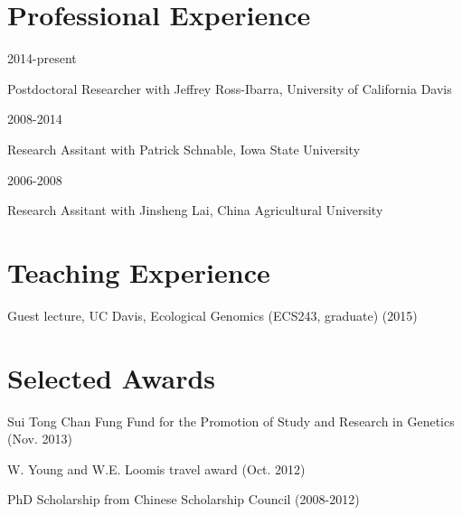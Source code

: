 \documentclass[letterpaper]{article}
\renewenvironment{itemize}{
  \begin{list}{}{
    \setlength{\leftmargin}{1.5em}
  }
}{
  \end{list}
}
\begin{document}
\section*{Professional Experience}
\begin{minipage}{0.2\linewidth}
  2014-present \\
\end{minipage}
\begin{minipage}{0.7\linewidth}
  Postdoctoral Researcher with Jeffrey Ross-Ibarra, University of California Davis \\
\end{minipage}

\begin{minipage}{0.2\linewidth}
  2008-2014 \\
\end{minipage}
\begin{minipage}{0.7\linewidth}
  Research Assitant with Patrick Schnable, Iowa State University \\
\end{minipage}

\begin{minipage}{0.2\linewidth}
  2006-2008 \\
\end{minipage}
\begin{minipage}{0.7\linewidth}
  Research Assitant with Jinsheng Lai, China Agricultural University \\
\end{minipage}


\section*{Teaching Experience}
\begin {itemize}
\item Guest lecture, UC Davis, Ecological Genomics (ECS243, graduate) (2015)
\end{itemize}

\section*{Selected Awards}
\begin{itemize}
\item Sui Tong Chan Fung Fund for the Promotion of Study and Research in Genetics (Nov. 2013)
\item W. Young and W.E. Loomis travel award (Oct. 2012)
\item PhD Scholarship from Chinese Scholarship Council (2008-2012)

\end{itemize}
\end{document}
